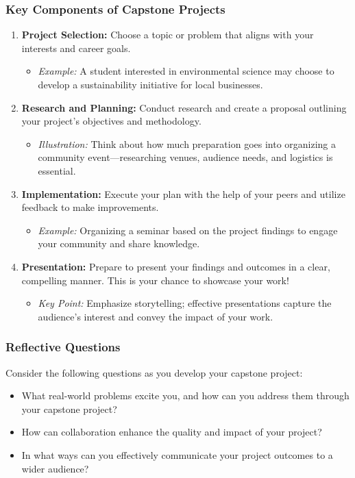 \documentclass[aspectratio=169]{beamer}
\begin{document}
\begin{frame}[fragile]
    \frametitle{Key Components of Capstone Projects}
    \begin{enumerate}
        \item \textbf{Project Selection:} Choose a topic or problem that aligns with your interests and career goals.
            \begin{itemize}
                \item \textit{Example:} A student interested in environmental science may choose to develop a sustainability initiative for local businesses.
            \end{itemize}
        \item \textbf{Research and Planning:} Conduct research and create a proposal outlining your project’s objectives and methodology.
            \begin{itemize}
                \item \textit{Illustration:} Think about how much preparation goes into organizing a community event—researching venues, audience needs, and logistics is essential.
            \end{itemize}
        \item \textbf{Implementation:} Execute your plan with the help of your peers and utilize feedback to make improvements.
            \begin{itemize}
                \item \textit{Example:} Organizing a seminar based on the project findings to engage your community and share knowledge.
            \end{itemize}
        \item \textbf{Presentation:} Prepare to present your findings and outcomes in a clear, compelling manner. This is your chance to showcase your work!
            \begin{itemize}
                \item \textit{Key Point:} Emphasize storytelling; effective presentations capture the audience’s interest and convey the impact of your work.
            \end{itemize}
    \end{enumerate}
\end{frame}

\begin{frame}[fragile]
    \frametitle{Reflective Questions}
    Consider the following questions as you develop your capstone project:
    \begin{itemize}
        \item What real-world problems excite you, and how can you address them through your capstone project?
        \item How can collaboration enhance the quality and impact of your project?
        \item In what ways can you effectively communicate your project outcomes to a wider audience?
    \end{itemize}
\end{frame}
\end{document}
